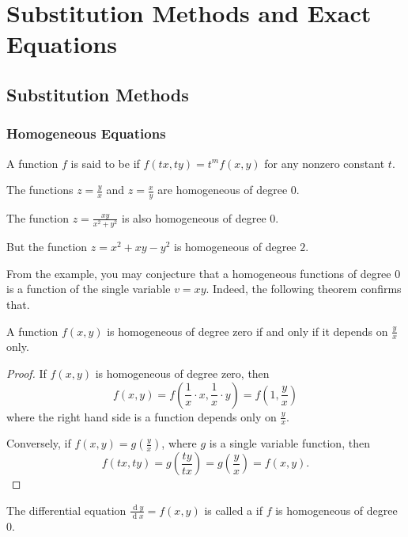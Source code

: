 \chapter{Substitution Methods and Exact Equations}

\section{Substitution Methods}
\subsection{Homogeneous Equations}

\begin{definition}
  A function $f$ is said to be  if $f(tx, ty)=t^mf(x, y)$ for any nonzero constant $t$.
\end{definition}

\begin{example}
  The functions $z=\frac{y}{x}$ and $z=\frac{x}{y}$ are homogeneous of degree $0$.
  
  The function $z=\frac{xy}{x^2+y^2}$ is also homogeneous of degree $0$.

  But the function $z=x^2+xy-y^2$ is homogeneous of degree $2$.
\end{example}

From the example, you may conjecture that a homogeneous functions of degree $0$ is  a function of the single variable $v=xy$. 
Indeed, the following theorem confirms that.

\begin{theorem}\label{thm:homegeneity}
  A function $f(x, y)$ is homogeneous of degree zero if and only if it depends on $\frac yx$ only.
\end{theorem}
\begin{proof}
  If $f(x, y)$ is homogeneous of degree zero, then \[f(x, y)=f\left(\frac{1}x\cdot x, \frac{1}{x}\cdot y\right)=f\left(1, \frac{y}{x}\right)\]
  where the right hand side is a function depends only on $\frac yx$.

  Conversely, if $f(x, y)=g\left(\frac yx\right)$, where $g$ is a single variable function, then
  \[f(tx, ty)=g\left(\frac{ty}{tx}\right)=g\left(\frac yx\right)=f(x, y).\]
\end{proof}

\begin{definition}
  The differential equation $\frac{\operatorname{d} y}{\operatorname{d} x}=f(x, y)$ is called a  if $f$ is homogeneous of degree $0$.
\end{definition}


